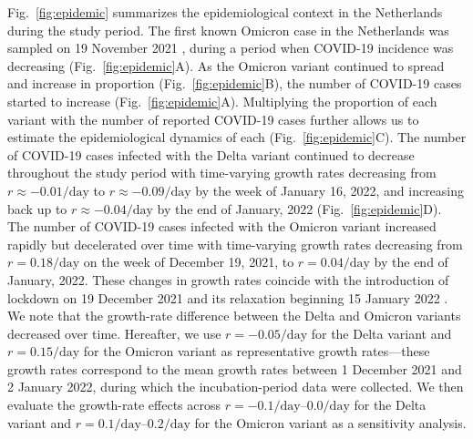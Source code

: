 \documentclass[12pt]{article}
\newcommand{\fref}[1]{Fig.~\ref{fig:#1}}
\begin{document}
\fref{epidemic} summarizes the epidemiological context in the Netherlands during the study period.
The first known Omicron case in the Netherlands was sampled on 19 November 2021 \citep{backer2021omicron}, during a period when COVID-19 incidence was decreasing (\fref{epidemic}A).
As the Omicron variant continued to spread and increase in proportion (\fref{epidemic}B), the number of COVID-19 cases started to increase (\fref{epidemic}A).
Multiplying the proportion of each variant with the number of reported COVID-19 cases further allows us to estimate the epidemiological dynamics of each (\fref{epidemic}C).
The number of COVID-19 cases infected with the Delta variant continued to decrease throughout the study period with time-varying growth rates decreasing from $r \approx -0.01/\mathrm{day}$ to $r \approx -0.09/\mathrm{day}$ by the week of January 16, 2022, and increasing back up to $r \approx -0.04/\mathrm{day}$ by the end of January, 2022 (\fref{epidemic}D).
The number of COVID-19 cases infected with the Omicron variant increased rapidly but decelerated over time with time-varying growth rates decreasing from $r=0.18/\mathrm{day}$ on the week of December 19, 2021, to $r=0.04/\mathrm{day}$ by the end of January, 2022.
These changes in growth rates coincide with the introduction of lockdown on 19 December 2021 \citep{netherlandslockdown} and its relaxation beginning 15 January 2022 \citep{netherlandsrelax,netherlandsopen}.
We note that the growth-rate difference between the Delta and Omicron variants decreased over time.
Hereafter, we use $r=-0.05/\mathrm{day}$ for the Delta variant and $r=0.15/\mathrm{day}$ for the Omicron variant as representative growth rates---these growth rates correspond to the mean growth rates between 1 December 2021 and 2 January 2022, during which the incubation-period data were collected.
We then evaluate the growth-rate effects across $r=-0.1/\mathrm{day}$--$0.0/\mathrm{day}$ for the Delta variant and $r=0.1/\mathrm{day}$--$0.2/\mathrm{day}$ for the Omicron variant as a sensitivity analysis.
\end{document}
